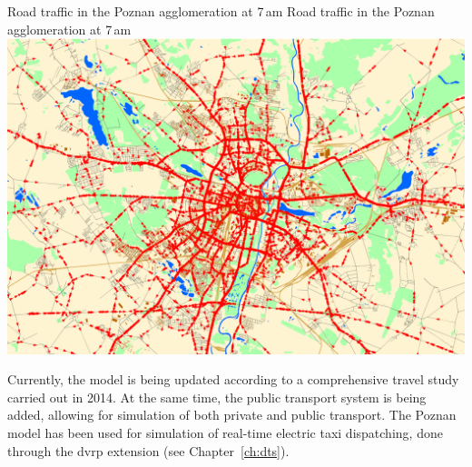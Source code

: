 \createfigure%
{Road traffic in the Poznan agglomeration at 7\,am}%
{Road traffic in the Poznan agglomeration at 7\,am}%
{\label{fig:poznan_traffic_simulation}}%
{\includegraphics[width=\textwidth, angle=0]{scenarios/figures/poznan_traffic_simulation}}%
{}%

Currently, the model is being updated according to a comprehensive travel study carried out in 2014. At the same time, the public transport system is being added, allowing for simulation of both private and public transport. The Poznan model has been used for simulation of real-time electric taxi dispatching, done through the \gls{dvrp} \gls{extension} (see Chapter~\ref{ch:dts}).

